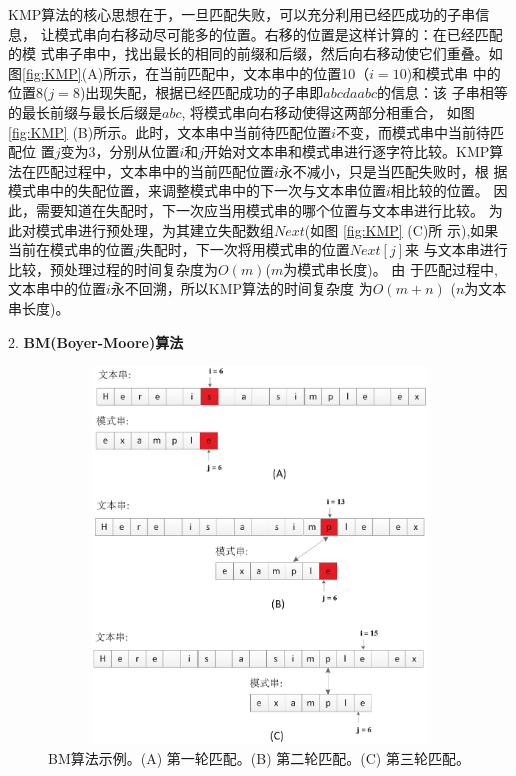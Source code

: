 KMP算法的核心思想在于，一旦匹配失败，可以充分利用已经匹成功的子串信息，
让模式串向右移动尽可能多的位置。右移的位置是这样计算的：在已经匹配的模
式串子串中，找出最长的相同的前缀和后缀，然后向右移动使它们重叠。如
图\ref{fig:KMP}(A)所示，在当前匹配中，文本串中的位置10（$i=10$)和模式串
中的位置8($j=8$)出现失配，根据已经匹配成功的子串即$abcdaabc$的信息：该
子串相等的最长前缀与最长后缀是$abc$, 将模式串向右移动使得这两部分相重合，
如图 \ref{fig:KMP}
(B)所示。此时，文本串中当前待匹配位置$i$不变，而模式串中当前待匹配位
置$j$变为3，分别从位置$i$和$j$开始对文本串和模式串进行逐字符比较。KMP算
法在匹配过程中，文本串中的当前匹配位置$i$永不减小，只是当匹配失败时，根
据模式串中的失配位置，来调整模式串中的下一次与文本串位置$i$相比较的位置。
因此，需要知道在失配时，下一次应当用模式串的哪个位置与文本串进行比较。
为此对模式串进行预处理，为其建立失配数组$Next$(如图 \ref{fig:KMP} (C)所
示),如果当前在模式串的位置$j$失配时，下一次将用模式串的位置$Next[j]$来
与文本串进行比较，预处理过程的时间复杂度为$O(m)$($m$为模式串长度)。 由
于匹配过程中, 文本串中的位置$i$永不回溯，所以KMP算法的时间复杂度
为$O(m+n)$ ($n$为文本串长度)。

2. \textbf{BM(Boyer-Moore)算法}

\begin{figure}[H]
  \centering
  \includegraphics[height=10cm ,width=12cm]{figures/1_Introduction/BM.eps}
  \caption{BM算法示例。(A) 第一轮匹配。(B) 第二轮匹配。(C) 第三轮匹配。}
  \label{fig:BM}
\end{figure}

